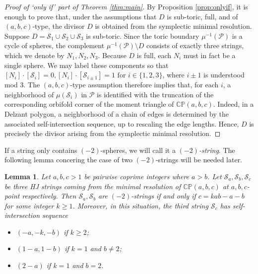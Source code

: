 \documentclass[11pt]{article}
\newtheorem{lemma}[theorem]{Lemma}
\theoremstyle{definition}
\theoremstyle{remark}
\newcommand{\CP}{\mathbb{CP}}
\newcommand{\st}{\mathcal{S}}
\begin{document}
\begin{proof}[Proof of `only if' part of Theorem \ref{thm:main}]
  By Proposition \ref{prop:onlyif}, it is enough to prove that, under the assumptions that $D$ is sub-toric, full, and of $(a,b,c)$-type, the divisor $D$ is obtained from the symplectic minimal resolution. Suppose $D=\st_1\cup\st_2\cup\st_3$ is sub-toric. Since the toric boundary $\mu^{-1}(\mathcal{P})$ is a cycle of spheres, the complement $\mu^{-1}(\mathcal{P})\setminus D$ consists of exactly three strings, which we denote by $N_1,N_2,N_3$. Because $D$ is full, each $N_i$ must in fact be a single sphere. We may label these components so that
  \(
    [N_i]\cdot [\st_i]=0, [N_i]\cdot [\st_{i\pm 1}]=1 \text{ for }i\in\{1,2,3\}
  \), where $i\pm 1$ is understood mod $3$.
  The $(a,b,c)$-type assumption therefore implies that, for each $i$, a neighborhood of $\mu(\st_i)$ in $\mathcal{P}$ is identified with the truncation of the corresponding orbifold corner of the moment triangle of $\CP(a,b,c)$. Indeed, in a Delzant polygon, a neighborhood of a chain of edges is determined by the associated self-intersection sequence, up to rescaling the edge lengths. Hence, $D$ is precisely the divisor arising from the symplectic minimal resolution.
\end{proof}

If a string only contains $(-2)$-spheres, we will call it a \emph{$(-2)$-string}. The following lemma concering the case of two $(-2)$-strings will be needed later.

\begin{lemma}\label{lem:-2chains}
Let $a,b,c>1$ be pairwise coprime integers where $a>b$. Let $\st_a,\st_b,\st_c$ be three HJ strings coming from the minimal resolution of $\mathbb{CP}(a,b,c)$ at $a,b,c$-point respectively. Then $\st_a,\st_b$ are $(-2)$-strings if and only if $c=kab-a-b$ for some integer $k\ge 1$.
Moreover, in this situation, the third string $\st_c$ has self-intersection sequence
\begin{itemize}[nosep]
    \item $(-a,-k,-b)$ if $k\ge 2$; 
    \item $(1-a,1-b)$ if $k=1$ and $b\neq 2$;
    \item $(2-a)$ if $k=1$ and $b=2$.
\end{itemize}

\end{lemma}
\end{document}
